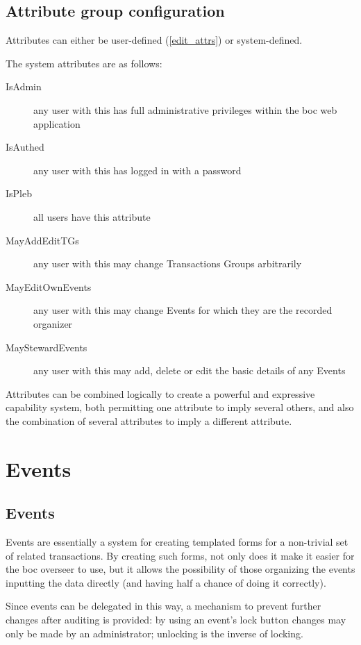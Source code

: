 \documentclass{report}
\begin{document}
\subsection{Attribute group configuration}\label{attr_groups}

Attributes can either be user-defined (\autoref{edit_attrs}) or system-defined.

The system attributes are as follows:

\begin{description}
\item[IsAdmin] any user with this has full administrative privileges within the boc web application
\item[IsAuthed] any user with this has logged in with a password
\item[IsPleb] all users have this attribute
\item[MayAddEditTGs] any user with this may change Transactions Groups arbitrarily
\item[MayEditOwnEvents] any user with this may change Events for which they are the recorded organizer
\item[MayStewardEvents] any user with this may add, delete or edit the basic details of any Events
\end{description}

Attributes can be combined logically to create a powerful and expressive capability system, both permitting one attribute to imply several others, and also the combination of several attributes to imply a different attribute.

\section{Events}

\subsection{Events}

Events are essentially a system for creating templated forms for a non-trivial set of related transactions.  By creating such forms, not only does it make it easier for the boc overseer to use, but it allows the possibility of those organizing the events inputting the data directly (and having half a chance of doing it correctly).

Since events can be delegated in this way, a mechanism to prevent further changes after auditing is provided: by using an event's lock button changes may only be made by an administrator; unlocking is the inverse of locking.
\end{document}
